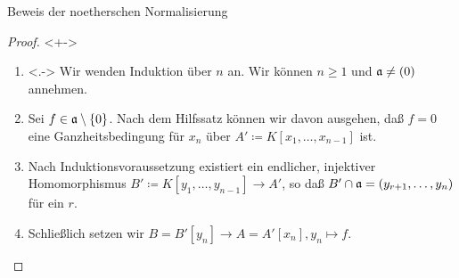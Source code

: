 \begin{frame}{Beweis der noetherschen Normalisierung}
	\begin{proof}<+->
		\begin{enumerate}[<+->]
		\item<.->
			Wir wenden Induktion über \(n\) an. Wir können \(n \ge 1\) und \(\mathfrak{a} \neq (0)\) annehmen.
		\item
			Sei \(f \in \mathfrak{a} \setminus \{0\}\). Nach dem Hilfssatz können wir
			davon ausgehen, daß \(f = 0\) eine
			Ganzheitsbedingung für \(x_n\) über \(A' \coloneqq K[x_1, \dotsc, x_{n - 1}]\) ist.
		\item
			Nach Induktionsvoraussetzung existiert ein endlicher, injektiver Homomorphismus \(B' \coloneqq K[y_1, \dotsc,
			y_{n - 1}] \to A'\), so daß \(B' \cap \mathfrak{a} = (y_{r + 1}, \dotsc, y_n)\) für ein \(r\). 
		\item
			Schließlich setzen wir \(B = B'[y_n] \to A = A'[x_n], y_n \mapsto f\).
			\qedhere
		\end{enumerate}
	\end{proof}
\end{frame}


